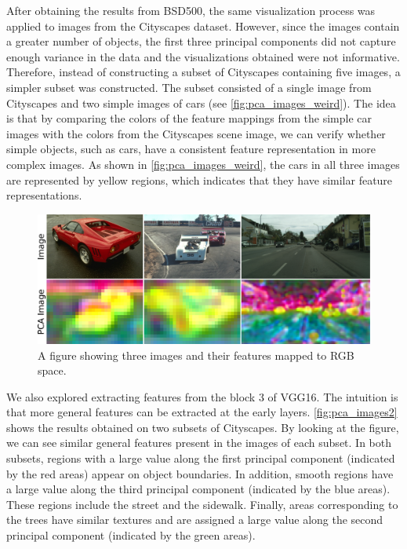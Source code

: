 After obtaining the results from BSD500, the same visualization process was applied to images from the Cityscapes dataset. However, since the images contain a greater number of objects, the first three principal components did not capture enough variance in the data and the visualizations obtained were not informative. Therefore, instead of constructing a subset of Cityscapes containing five images, a simpler subset was constructed. The subset consisted of a single image from Cityscapes and two simple images of cars (see \autoref{fig:pca_images_weird}). The idea is that by comparing the colors of the feature mappings from the simple car images with the colors from the Cityscapes scene image, we can verify whether simple objects, such as cars, have a consistent feature representation in more complex images. As shown in \autoref{fig:pca_images_weird}, the cars in all three images are represented by yellow regions, which indicates that they have similar feature representations.

\begin{figure}[t]
    \centering
    \includegraphics[width=.85\textwidth]{figures/pca_images_weird.pdf}
    \caption{A figure showing three images and their features mapped to RGB space.}
    \label{fig:pca_images_weird}
\end{figure}

We also explored extracting features from the block 3 of VGG16. The intuition is that more general features can be extracted at the early layers. \autoref{fig:pca_images2} shows the results obtained on two subsets of Cityscapes. By looking at the figure, we can see similar general features present in the images of each subset. In both subsets, regions with a large value along the first principal component (indicated by the red areas) appear on object boundaries. In addition, smooth regions have a large value along the third principal component (indicated by the blue areas). These regions include the street and the sidewalk. Finally, areas corresponding to the trees have similar textures and are assigned a large value along the second principal component (indicated by the green areas).

